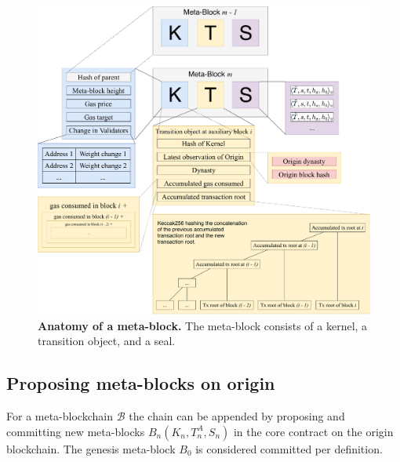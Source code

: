 \documentclass[12pt,a4paper]{article}
\begin{document}

\begin{figure}
    \centering
	\includegraphics[width=\textwidth]{meta_block}
	\caption{\textbf{Anatomy of a meta-block.}
		The meta-block consists of a kernel, a transition object, and a seal.
	}
	\label{fig:meta_block}
\end{figure}

\subsection{Proposing meta-blocks on origin}

For a meta-blockchain $\mathcal{B}$ the chain can be appended by proposing and committing new meta-blocks $B_n(K_n, T^A_n, S_n)$ in the core contract on the origin block\-chain. The genesis meta-block $B_0$ is considered committed per definition.
\end{document}
